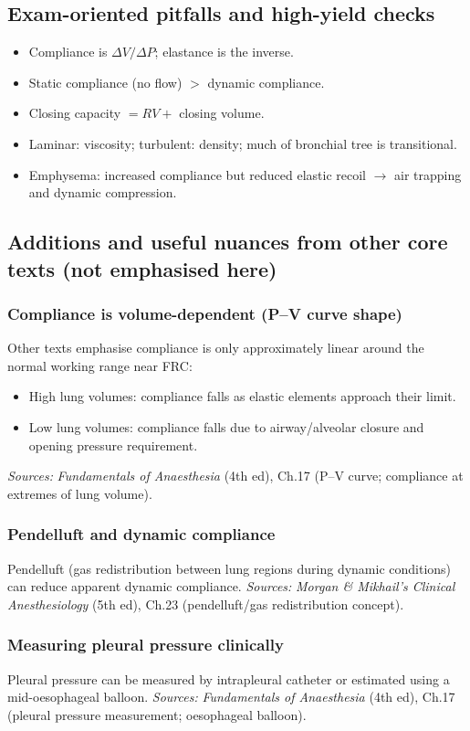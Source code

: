 \documentclass[11pt,a4paper]{article}
\begin{document}
\subsection{Exam-oriented pitfalls and high-yield checks}
\begin{itemize}
  \item Compliance is $\Delta V/\Delta P$; elastance is the inverse.
  \item Static compliance (no flow) $>$ dynamic compliance.
  \item Closing capacity $= RV +$ closing volume.
  \item Laminar: viscosity; turbulent: density; much of bronchial tree is transitional.
  \item Emphysema: increased compliance but reduced elastic recoil $\rightarrow$ air trapping and dynamic compression.
\end{itemize}

\subsection{Additions and useful nuances from other core texts (not emphasised here)}
\subsubsection{Compliance is volume-dependent (P--V curve shape)}
Other texts emphasise compliance is only approximately linear around the normal working range near FRC:
\begin{itemize}
  \item High lung volumes: compliance falls as elastic elements approach their limit.
  \item Low lung volumes: compliance falls due to airway/alveolar closure and opening pressure requirement.
\end{itemize}
\textit{Sources:} \emph{Fundamentals of Anaesthesia} (4th ed), Ch.17 (P--V curve; compliance at extremes of lung volume).

\subsubsection{Pendelluft and dynamic compliance}
Pendelluft (gas redistribution between lung regions during dynamic conditions) can reduce apparent dynamic compliance.
\textit{Sources:} \emph{Morgan \& Mikhail's Clinical Anesthesiology} (5th ed), Ch.23 (pendelluft/gas redistribution concept).

\subsubsection{Measuring pleural pressure clinically}
Pleural pressure can be measured by intrapleural catheter or estimated using a mid-oesophageal balloon.
\textit{Sources:} \emph{Fundamentals of Anaesthesia} (4th ed), Ch.17 (pleural pressure measurement; oesophageal balloon).
\end{document}
